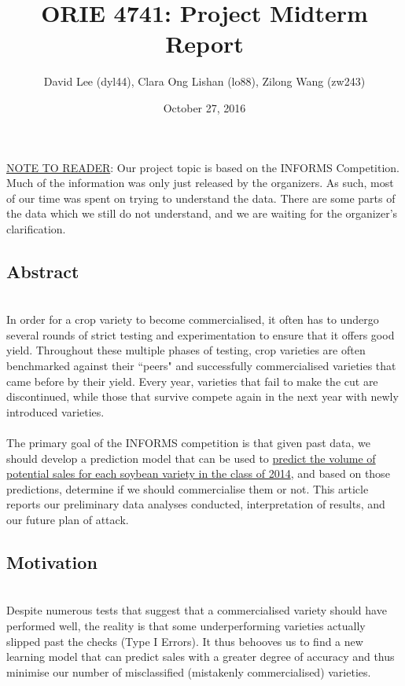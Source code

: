 \documentclass[psamsfonts]{amsart}
\title{ORIE 4741: Project Midterm Report}
\author{David Lee (dyl44), Clara Ong Lishan (lo88), Zilong Wang (zw243)}
\date{October 27, 2016}
\begin{document}
\maketitle

\underline{NOTE TO READER}: Our project topic is based on the INFORMS Competition. Much of the information was only just released by the organizers. As such, most of our time was spent on trying to understand the data. There are some parts of the data which we still do not understand, and we are waiting for the organizer's clarification. 

\subsection*{Abstract}
\hfill \\

In order for a crop variety to become commercialised, it often has to undergo several rounds of strict testing and experimentation to ensure that it offers good yield. Throughout these multiple phases of testing, crop varieties are often benchmarked against their ``peers" and successfully commercialised varieties that came before by their yield. Every year, varieties that fail to make the cut are discontinued, while those that survive compete again in the next year with newly introduced varieties.\\
\\
 The primary goal of the INFORMS competition is that given past data, we should develop a prediction model that can be used to \underline{predict the volume of potential sales for each soybean variety in the class of 2014}, and based on those predictions, determine if we should commercialise them or not. This article reports our preliminary data analyses conducted, interpretation of results, and our future plan of attack. \\


\subsection*{Motivation}
\hfill \\

 Despite numerous tests that suggest that a commercialised variety should have performed well, the reality is that some underperforming varieties actually slipped past the checks (Type I Errors). It thus behooves us to find a new learning model that can predict sales with a greater degree of accuracy and thus minimise our number of misclassified (mistakenly commercialised) varieties.\\
\end{document}
